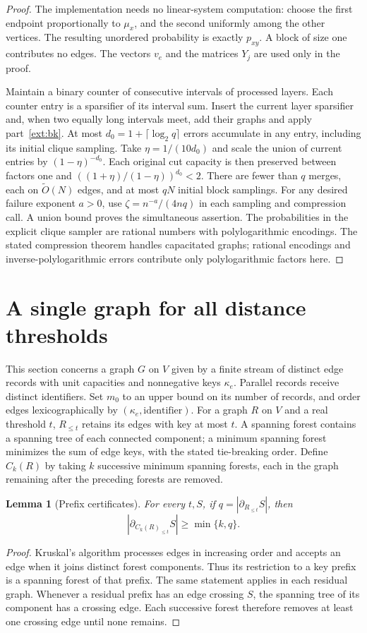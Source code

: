 \documentclass[11pt]{article}
\newtheorem{lemma}[theorem]{Lemma}
\theoremstyle{definition}
\newcommand{\wt}{\widetilde}
\newcommand{\cut}{\partial}
\begin{document}
\begin{proof}
The implementation needs no linear-system computation: choose the first
endpoint proportionally to $\mu_x$, and the second uniformly among
the other vertices. The resulting unordered probability is exactly
$p_{xy}$. A block of size one contributes no edges. The vectors $v_e$
and the matrices $Y_j$ are used only in the proof.

Maintain a binary counter of consecutive intervals of processed layers.
Each counter entry is a sparsifier of its interval sum. Insert the current
layer sparsifier and, when two equally long intervals meet, add their
graphs and apply part~\ref{ext:bk}. At most
$d_0=1+\lceil\log_2 q\rceil$ errors accumulate in any entry, including
its initial clique sampling. Take $\eta=1/(10d_0)$ and scale the union
of current entries by $(1-\eta)^{-d_0}$. Each original cut capacity is
then preserved between factors one and
$((1+\eta)/(1-\eta))^{d_0}<2$.
There are fewer than $q$ merges, each on $\wt O(N)$ edges, and at most
$qN$ initial block samplings. For any desired failure exponent $a>0$,
use $\zeta=n^{-a}/(4nq)$ in each sampling and compression call.
A union bound proves the simultaneous assertion.
The probabilities in the explicit clique sampler are rational numbers
with polylogarithmic encodings. The stated compression theorem handles
capacitated graphs; rational encodings and inverse-polylogarithmic errors
contribute only polylogarithmic factors here.
\end{proof}

\section{A single graph for all distance thresholds}
\label{sec:sketch}

This section concerns a graph $G$ on $V$ given by a finite stream of distinct edge records with unit
capacities and nonnegative keys $\kappa_e$. Parallel records receive distinct
identifiers. Set $m_0$ to an upper bound on its number of records, and order
edges lexicographically by $(\kappa_e,\text{identifier})$. For a graph $R$ on $V$ and a real threshold $t$,
$R_{\le t}$ retains its edges with key at most $t$. A spanning forest contains
a spanning tree of each connected component; a minimum spanning forest
minimizes the sum of edge keys, with the stated tie-breaking order.
Define $C_k(R)$ by taking $k$ successive minimum spanning forests,
each in the graph remaining after the preceding forests are removed.

\begin{lemma}[Prefix certificates]\label{lem:msf}
For every $t,S$, if $q=|\cut_{R_{\le t}}S|$, then
\[
 |\cut_{C_k(R)_{\le t}}S|\ge\min\{k,q\}.
\]
\end{lemma}
\begin{proof}
Kruskal's algorithm processes edges in increasing order and accepts an edge
when it joins distinct forest components. Thus its restriction to a key
prefix is a spanning forest of that prefix. The same statement applies in
each residual graph. Whenever a residual prefix has an edge crossing $S$,
the spanning tree of its component has a crossing edge. Each successive
forest therefore removes at least one crossing edge until none remains.
\end{proof}
\end{document}
